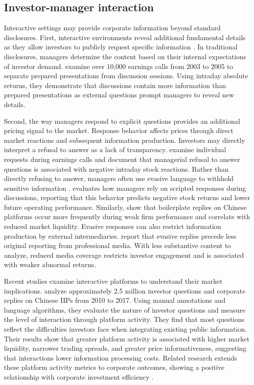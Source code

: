 \documentclass[12pt]{article}
\begin{document}
\subsection{Investor-manager interaction}

Interactive settings may provide corporate information beyond standard disclosures. First, interactive environments reveal additional fundamental details as they allow investors to publicly request specific information \citep{hollander2010}. In traditional disclosures, managers determine the content based on their internal expectations of investor demand. \citet{matsumoto2011} examine over 10,000 earnings calls from 2003 to 2005 to separate prepared presentations from discussion sessions. Using intraday absolute returns, they demonstrate that discussions contain more information than prepared presentations as external questions prompt managers to reveal new details.

Second, the way managers respond to explicit questions provides an additional pricing signal to the market. Response behavior affects prices through direct market reactions and subsequent information production. Investors may directly interpret a refusal to answer as a lack of transparency. \citet{hollander2010} examine individual requests during earnings calls and document that managerial refusal to answer questions is associated with negative intraday stock reactions. Rather than directly refusing to answer, managers often use evasive language to withhold sensitive information \citep{gow2021}. \citet{lee2016} evaluates how managers rely on scripted responses during discussions, reporting that this behavior predicts negative stock returns and lower future operating performance. Similarly, \citet{xie2023} show that boilerplate replies on Chinese platforms occur more frequently during weak firm performance and correlate with reduced market liquidity. Evasive responses can also restrict information production by external intermediaries. \citet{boustanifar2025} report that evasive replies precede less original reporting from professional media. With less substantive content to analyze, reduced media coverage restricts investor engagement and is associated with weaker abnormal returns.


Recent studies examine interactive platforms to understand their market implications. \citet{lee2022shall} analyze approximately 2.5 million investor questions and corporate replies on Chinese IIPs from 2010 to 2017. Using manual annotations and language algorithms, they evaluate the nature of investor questions and measure the level of interaction through platform activity. They find that most questions reflect the difficulties investors face when integrating existing public information. Their results show that greater platform activity is associated with higher market liquidity, narrower trading spreads, and greater price informativeness, suggesting that interactions lower information processing costs. Related research extends these platform activity metrics to corporate outcomes, showing a positive relationship with corporate investment efficiency \citep{xu2024}. 
\end{document}
